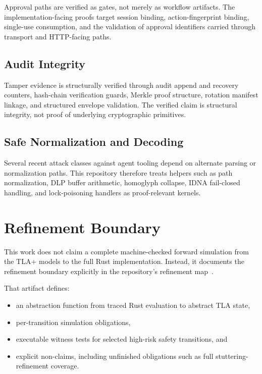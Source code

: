 \documentclass[11pt]{article}
\begin{document}
Approval paths are verified as gates, not merely as workflow artifacts. The
implementation-facing proofs target session binding, action-fingerprint
binding, single-use consumption, and the validation of approval identifiers
carried through transport and HTTP-facing paths.

\subsection{Audit Integrity}

Tamper evidence is structurally verified through audit append and recovery
counters, hash-chain verification guards, Merkle proof structure, rotation
manifest linkage, and structured envelope validation. The verified claim is
structural integrity, not proof of underlying cryptographic primitives.

\subsection{Safe Normalization and Decoding}

Several recent attack classes against agent tooling depend on alternate parsing
or normalization paths. This repository therefore treats helpers such as path
normalization, DLP buffer arithmetic, homoglyph collapse, IDNA fail-closed
handling, and lock-poisoning handlers as proof-relevant kernels.

\section{Refinement Boundary}

This work does not claim a complete machine-checked forward simulation from the
TLA+ models to the full Rust implementation. Instead, it documents the
refinement boundary explicitly in the repository's refinement map~\cite{vellavetoRefinementMap}.

That artifact defines:

\begin{itemize}[leftmargin=*]
\item an abstraction function from traced Rust evaluation to abstract TLA state,
\item per-transition simulation obligations,
\item executable witness tests for selected high-risk safety transitions, and
\item explicit non-claims, including unfinished obligations such as full
stuttering-refinement coverage.
\end{itemize}
\end{document}
